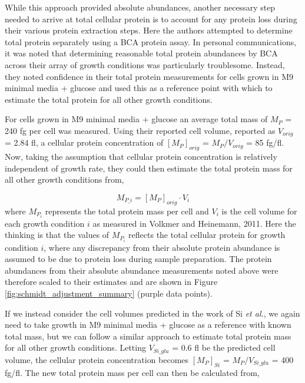 While this approach provided absolute abundances, another necessary step needed
to arrive at total cellular protein is to account for any protein loss during
their various protein extraction steps. Here the authors attempted to determine
total protein separately using a BCA protein assay.  In personal communications,
it was noted that determining reasonable total protein abundances by BCA across
their array of growth conditions  was particularly troublesome. Instead, they
noted confidence in their total protein measurements for cells grown in M9
minimal media + glucose and  used this as a reference point with which to
estimate the total protein for all other growth conditions.

For cells grown in M9 minimal media + glucose an average total mass of $M_P$ =
240 fg per cell was measured. Using their reported cell volume, reported as
$V_{orig}$ = 2.84 fl, a cellular protein concentration of $[M_P]_{orig}$ =
$M_P/V_{orig}$ = 85 fg/fl. Now, taking the assumption that cellular protein
concentration is relatively independent of growth rate, they could then estimate
the total protein mass for all other growth conditions from,

\begin{equation}
	M_{P\_i} = [M_P]_{orig} \cdot V_{i}
\end{equation}
where $M_{P_i}$ represents the total protein mass per cell and $V_{i}$ is the
cell volume for each growth condition $i$ as measured in Volkmer and Heinemann,
2011. Here the thinking is that the values of $M_{P_i}$ reflects the total
cellular protein for growth condition $i$, where any discrepancy from their
absolute protein abundance is assumed to be due to protein loss during sample
preparation. The protein abundances from their absolute abundance measurements
noted above were therefore scaled to their estimates and are  shown in Figure
\ref{fig:schmidt_adjustment_summary} (purple data points).



If we instead consider the cell volumes predicted in the work of Si \textit{et al.},
we again need to take growth in M9 minimal media + glucose as a reference with known total mass,
but we can follow a similar approach to estimate total protein mass for all other growth conditions.
Letting  $V_{Si\_glu}$ = 0.6 fl be the predicted cell volume, the
cellular protein concentration becomes $[M_P]_{Si}$ = $M_P/V_{Si\_glu}$ = 400 fg/fl. The
new total protein mass per cell can then be calculated from,

